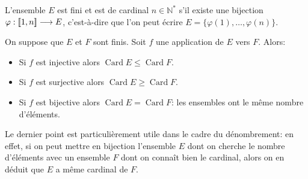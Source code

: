 \documentclass[11pt]{article}
\newcommand{\N}{\mathbb N}
\DeclareMathOperator{\Card}{\mathrm{Card}}
\DeclarePairedDelimiter{\zint}{[\![}{]\!]}
\theoremstyle{definition}
\theoremstyle{remark}
\begin{document}
\begin{defn}
	L'ensemble $E$ est fini et est de cardinal $n\in\N^*$ s'il existe une bijection $\varphi:\zint{1,n}\longrightarrow E$, c'est-à-dire que l'on peut écrire
	$E=\{\varphi(1),\ldots,\varphi(n) \}.$
\end{defn}

\begin{prop}
	On suppose que $E$ et $F$ sont finis. Soit $f$ une application de $E$ vers $F$. Alors:
	\begin{itemize}
		\item Si $f$ est injective alors $\Card E\leq \Card F$.
		\item Si $f$ est surjective alors $\Card E \geq \Card F$.
		\item Si $f$ est bijective alors $\Card E = \Card F$: les ensembles ont le même nombre d'éléments.
	\end{itemize}
\end{prop}

Le dernier point est particulièrement utile dans le cadre du dénombrement: en effet, si on peut mettre en bijection l'ensemble $E$ dont on cherche le nombre d'éléments avec un ensemble $F$ dont on connaît bien le cardinal, alors on en déduit que $E$ a même cardinal de $F$.
\end{document}
